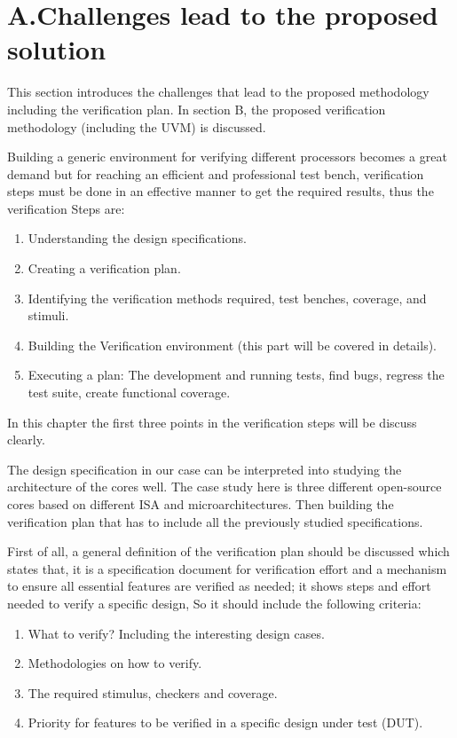 \documentclass[conference,10 pt,twoside]{IEEEtran}
\begin{document}
\section*{A.Challenges lead to the proposed solution}
This section introduces the challenges that lead to the proposed methodology including the verification plan. In section B, the proposed verification methodology (including the UVM) is discussed.
\par
Building a generic environment for verifying different processors becomes a great demand but for reaching an efficient and professional test bench, verification steps must be done in an effective manner to get the required results, thus the verification Steps are:
\usetikzlibrary{shapes,arrows}
\begin{enumerate}
\item Understanding the design specifications.
\item Creating a verification plan.
\item Identifying the verification methods required, test benches, coverage, and stimuli.
\item Building the Verification environment (this part will be covered in details).
\item Executing a plan: The development and running tests, find bugs, regress the test suite, create functional coverage.
\end{enumerate}
In this chapter the first three points in the verification steps will be discuss clearly.\par
The design specification in our case can be interpreted  into studying the architecture of the cores well. The case study here is three different open-source cores based on different ISA and microarchitectures. Then building the verification plan that has to include all the previously studied specifications. 
\par
First of all, a general definition of the verification plan should be discussed which states that, it is a specification document for verification effort and a mechanism to ensure all essential features are verified as needed; it shows steps and effort needed to verify a specific design, So it should include the following criteria: 
\begin{enumerate}
\item What to verify?  Including the interesting design cases.
\item Methodologies on how to verify.
\item The required stimulus, checkers and coverage.
\item Priority for features to be verified in a specific design under test (DUT).  
\end{enumerate}
\end{document}
